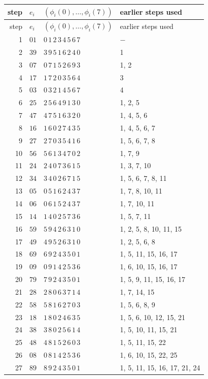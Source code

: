 \begin{longtable}{r l l l}
\toprule
step & $e_i$ & $(\phi_i(0),\ldots,\phi_i(7))$ & earlier steps used \\
\midrule
\endfirsthead
\toprule
step & $e_i$ & $(\phi_i(0),\ldots,\phi_i(7))$ & earlier steps used \\
\midrule
\endhead
1 & $01$ & $0\,1\,2\,3\,4\,5\,6\,7$ & $-$ \\
2 & $39$ & $3\,9\,5\,1\,6\,2\,4\,0$ & 1 \\
3 & $07$ & $0\,7\,1\,5\,2\,6\,9\,3$ & 1, 2 \\
4 & $17$ & $1\,7\,2\,0\,3\,5\,6\,4$ & 3 \\
5 & $03$ & $0\,3\,2\,1\,4\,5\,6\,7$ & 4 \\
6 & $25$ & $2\,5\,6\,4\,9\,1\,3\,0$ & 1, 2, 5 \\
7 & $47$ & $4\,7\,5\,1\,6\,3\,2\,0$ & 1, 4, 5, 6 \\
8 & $16$ & $1\,6\,0\,2\,7\,4\,3\,5$ & 1, 4, 5, 6, 7 \\
9 & $27$ & $2\,7\,0\,3\,5\,4\,1\,6$ & 1, 5, 6, 7, 8 \\
10 & $56$ & $5\,6\,1\,3\,4\,7\,0\,2$ & 1, 7, 9 \\
11 & $24$ & $2\,4\,0\,7\,3\,6\,1\,5$ & 1, 3, 7, 10 \\
12 & $34$ & $3\,4\,0\,2\,6\,7\,1\,5$ & 1, 5, 6, 7, 8, 11 \\
13 & $05$ & $0\,5\,1\,6\,2\,4\,3\,7$ & 1, 7, 8, 10, 11 \\
14 & $06$ & $0\,6\,1\,5\,2\,4\,3\,7$ & 1, 7, 10, 11 \\
15 & $14$ & $1\,4\,0\,2\,5\,7\,3\,6$ & 1, 5, 7, 11 \\
16 & $59$ & $5\,9\,4\,2\,6\,3\,1\,0$ & 1, 2, 5, 8, 10, 11, 15 \\
17 & $49$ & $4\,9\,5\,2\,6\,3\,1\,0$ & 1, 2, 5, 6, 8 \\
18 & $69$ & $6\,9\,2\,4\,3\,5\,0\,1$ & 1, 5, 11, 15, 16, 17 \\
19 & $09$ & $0\,9\,1\,4\,2\,5\,3\,6$ & 1, 6, 10, 15, 16, 17 \\
20 & $79$ & $7\,9\,2\,4\,3\,5\,0\,1$ & 1, 5, 9, 11, 15, 16, 17 \\
21 & $28$ & $2\,8\,0\,6\,3\,7\,1\,4$ & 1, 7, 14, 15 \\
22 & $58$ & $5\,8\,1\,6\,2\,7\,0\,3$ & 1, 5, 6, 8, 9 \\
23 & $18$ & $1\,8\,0\,2\,4\,6\,3\,5$ & 1, 5, 6, 10, 12, 15, 21 \\
24 & $38$ & $3\,8\,0\,2\,5\,6\,1\,4$ & 1, 5, 10, 11, 15, 21 \\
25 & $48$ & $4\,8\,1\,5\,2\,6\,0\,3$ & 1, 5, 11, 15, 22 \\
26 & $08$ & $0\,8\,1\,4\,2\,5\,3\,6$ & 1, 6, 10, 15, 22, 25 \\
27 & $89$ & $8\,9\,2\,4\,3\,5\,0\,1$ & 1, 5, 11, 15, 16, 17, 21, 24 \\
\bottomrule
\end{longtable}